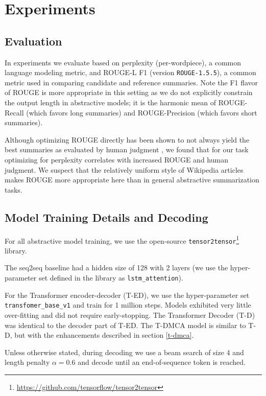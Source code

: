 \section{Experiments}

\subsection{Evaluation}
In experiments we evaluate based on perplexity (per-wordpiece), a common language
modeling metric, and ROUGE-L F1 (version \texttt{ROUGE-1.5.5}), a common metric used in comparing
candidate and reference summaries. Note the F1 flavor of ROUGE is more 
appropriate in this setting as we do not explicitly constrain the output length in abstractive models;
it is the harmonic
mean of ROUGE-Recall (which favors long summaries) and ROUGE-Precision (which favors short
summaries).

Although optimizing ROUGE directly has been shown to not always yield the best summaries as evaluated by
human judgment \citep{paulus2017deep}, we found that for our task optimizing for perplexity
correlates with increased ROUGE and human judgment. We suspect that the relatively uniform style
of Wikipedia articles makes ROUGE more appropriate here than in general abstractive summarization tasks.

\subsection{Model Training Details and Decoding}
For all abstractive model training, we use the open-source
\texttt{tensor2tensor}\footnote{\url{https://github.com/tensorflow/tensor2tensor}}
library. 

The seq2seq baseline had a hidden size of 128 with 2 layers (we use the hyper-parameter
set defined in the library as \texttt{lstm\_attention}).

For the Transformer encoder-decoder (T-ED), we use the hyper-parameter
set  \texttt{transfomer\_base\_v1}
and train for 1 million steps.
Models exhibited very little over-fitting and did not require early-stopping.
The Transformer Decoder (T-D) was identical to the decoder part of T-ED.
The T-DMCA model is similar to T-D, but with the enhancements described in
section \ref{t-dmca}.

Unless otherwise stated, during decoding we use a beam search of size 4 and length penalty $\alpha=0.6$
\citep{wu2016google} and decode until an end-of-sequence token is reached.

